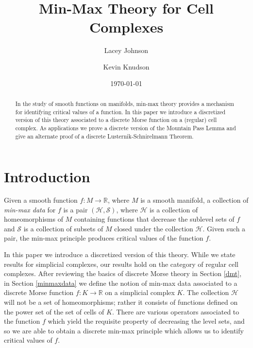 \documentclass[11pt]{amsart}
\theoremstyle{definition}
\newcommand{\zr}{{\mathbb R}}
\begin{document}
\title{Min-Max Theory for Cell Complexes}
\author{Lacey Johnson}
\author{Kevin Knudson}
\address{Department  of Mathematics,  University of Florida, Gainesville, FL 32611}


\date{\today}

\begin{abstract} In the study of smooth functions on manifolds, min-max theory provides a mechanism for identifying critical values of a function. In this paper we introduce a discretized version of this theory associated to a discrete Morse function on a (regular) cell complex. As applications we prove a discrete version of the Mountain Pass Lemma and give an alternate proof of a discrete Lusternik-Schnirelmann Theorem.
\end{abstract}



\maketitle

\section{Introduction}\label{intro} Given a smooth function $f:M\to\zr$, where $M$ is a smooth manifold, a collection of {\em min-max data} for $f$ is a pair $({\mathcal H},{\mathcal S})$, where ${\mathcal H}$ is a collection of homeomorphisms of $M$ containing functions that decrease the sublevel sets of $f$ and ${\mathcal S}$ is a collection of subsets of $M$ closed under the collection ${\mathcal H}$. Given such a pair, the min-max principle produces critical values of the function $f$.

In this paper we introduce a discretized version of this theory. While we state results for simplicial complexes, our results hold on the category of regular cell complexes. After reviewing the basics of discrete Morse theory in Section \ref{dmt}, in Section \ref{minmaxdata} we define the notion of min-max data associated to a discrete Morse function $f:K\to\zr$ on a simplicial complex $K$. The collection ${\mathcal H}$ will not be a set of homeomorphisms; rather it consists of functions defined on the power set of the set of cells of $K$. There are various operators associated to the function $f$ which yield the requisite property of decreasing the level sets, and so we are able to obtain a discrete min-max principle which allows us to identify critical values of $f$.
\end{document}

